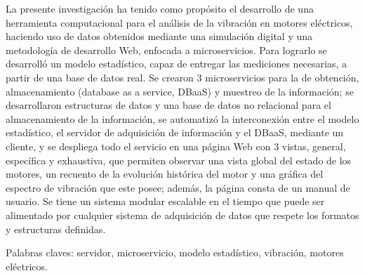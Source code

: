 La presente investigación ha tenido como propósito el desarrollo de una
herramienta computacional para el análisis de la vibración en motores
eléctricos, haciendo uso de  datos obtenidos mediante una simulación
digital y una metodología de desarrollo
Web, enfocada a microservicios. Para lograrlo se desarrolló un modelo
estadístico, capaz de entregar las mediciones necesarias, a partir de una base
de datos real. Se
crearon 3 microservicios para la de obtención, almacenamiento
(database as a service, DBaaS) y muestreo  de la información;
se desarrollaron estructuras de datos y una base de
datos no relacional para el almacenamiento de la información, se automatizó
la interconexión entre el modelo estadístico, el servidor de adquisición de
información y el DBaaS, mediante un cliente, y se despliega todo
el servicio en una página Web con 3 vistas, general, específica y
exhaustiva, que permiten observar una vista global del estado de
los motores, un recuento de la evolución histórica del
motor   y una gráfica  del espectro de
vibración que este posee;
además, la página consta de un  manual de usuario.
Se tiene un sistema  modular
 escalable en el tiempo que puede ser alimentado por cualquier sistema de
adquisición de datos que respete los formatos y estructuras definidas.

Palabras claves: servidor, microservicio, modelo estadístico, vibración,
motores eléctricos.

